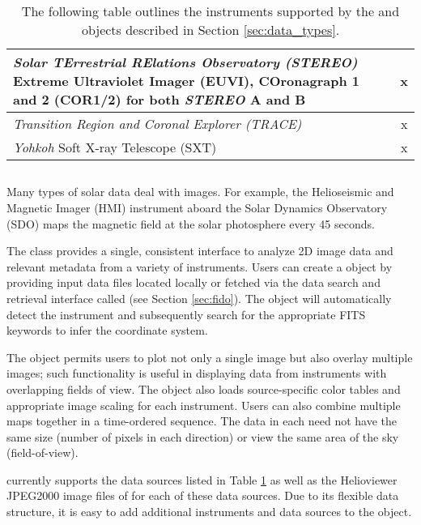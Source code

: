 \begin{table}
\begin{center}
\begin{tabular}{|p{10cm}|c|c|}
\hline
\textit{Solar TErrestrial RElations Observatory (STEREO)} Extreme Ultraviolet Imager (EUVI), COronagraph 1 and 2 (COR1/2) for both \textit{STEREO} A and B \citep{howard2008sun} & & x \\
\hline
\textit{Transition Region and Coronal Explorer (TRACE)} \citep{handy99} & & x \\
\hline
\textit{Yohkoh} Soft X-ray Telescope (SXT) \citep{tsuneta1991soft} & & x \\
\hline
\end{tabular}
\end{center}
\caption{The following table outlines the instruments supported by the \Timeseries and \Map objects described in Section \ref{sec:data_types}.}
\label{tab:instruments}
\end{table}

\subsection{\Map}
\label{sec:map}
Many types of solar data deal with images. For example, the Helioseismic and Magnetic Imager (HMI) instrument aboard the Solar Dynamics Observatory (SDO) maps the magnetic field at the solar photosphere every 45 seconds. 

The \Map class provides a single, consistent interface to analyze 2D image data and relevant metadata from a variety of instruments. 
Users can create a \Map object by providing input data files located locally or fetched via the \sunpypkg data search and retrieval interface called \Fido (see Section \ref{sec:fido}). The \Map object will automatically detect the instrument and subsequently search for the appropriate FITS keywords to infer the coordinate system.

The \Map object permits users to plot not only a single image but also overlay multiple images; such functionality is useful in displaying data from instruments with overlapping fields of view. The \Map object also loads source-specific color tables and appropriate image scaling for each instrument.
Users can also combine multiple maps together in a time-ordered sequence. The data in each \Map need not have the same size (number of pixels in each direction) or view the same area of the sky (field-of-view). 

\Map currently supports the data sources listed in Table \ref{tab:instruments} as well as the Helioviewer JPEG2000 image files of for each of these data sources. Due to its flexible data structure, it is easy to add additional instruments and data sources to the \Map object.
